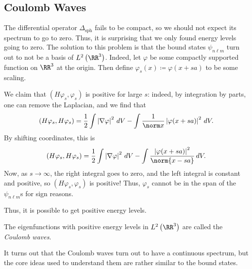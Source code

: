 \documentclass[../notes.tex]{subfiles}
\begin{document}
\subsection{Coulomb Waves}
The differential operator $\Delta_{\mathrm{sph}}$ fails to be compact, so we should not expect its spectrum to go to zero. Thus, it is surprising that we only found energy levels going to zero. The solution to this problem is that the bound states $\psi_{n\ell m}$ turn out to not be a basis of $L^2\left(\RR^3\right)$. Indeed, let $\varphi$ be some compactly supported function on $\RR^3$ at the origin. Then define $\varphi_s(x)\coloneqq\varphi(x+sa)$ to be some scaling.

We claim that $(H\varphi_s,\varphi_s)$ is positive for large $s$: indeed, by integration by parts, one can remove the Laplacian, and we find that
\[(H\varphi_s,H\varphi_s)=\frac12\int\left|\nabla\varphi\right|^2\,dV-\int\frac1{\norm x}\left|\varphi(x+sa)\right|^2\,dV.\]
By shifting coordinates, this is
\[(H\varphi_s,H\varphi_s)=\frac12\int\left|\nabla\varphi\right|^2\,dV-\int\frac{\left|\varphi(x+sa)\right|^2}{{\norm {x-sa}}}\,dV.\]
Now, as $s\to\infty$, the right integral goes to zero, and the left integral is constant and positive, so $(H\varphi_s,\varphi_s)$ is positive! Thus, $\varphi_s$ cannot be in the span of the $\psi_{n\ell m}$s for sign reasons.

Thus, it is possible to get positive energy levels.
\begin{definition}
	The eigenfunctions with positive energy levels in $L^2\left(\RR^3\right)$ are called the \textit{Coulomb waves}.
\end{definition}
It turns out that the Coulomb waves turn out to have a continuous spectrum, but the core ideas used to understand them are rather similar to the bound states.

\end{document}
